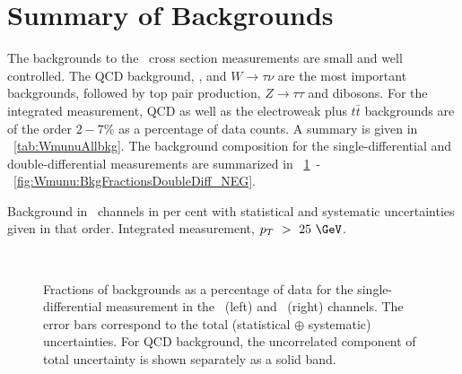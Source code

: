 \section{Summary of Backgrounds}

The backgrounds to the \Wmn\ cross section measurements are small and well controlled. The QCD background, \Zmm, and $W \to \tau\nu$ are the most important backgrounds, followed by top pair production, $Z \to \tau\tau$ and dibosons. For the integrated measurement, QCD as well as the electroweak plus $t\bar{t}$ backgrounds are of the order $2-7\%$ as a percentage of data counts. A summary is given in \Tab~\ref{tab:WmunuAllbkg}.
The background composition for the single-differential and double-differential measurements are summarized in \Fig~\ref{fig:Wmunu:bg_frac_vsEta_pt25}~-~\ref{fig:Wmunu:BkgFractionsDoubleDiff_NEG}.

\begin{table}
  \begin{center}
    
    \caption{ Background in \Wmn\ channels in per cent with statistical and systematic uncertainties given in that order. Integrated measurement, $p_T~>~25~\GeV$. }
    \label{tab:WmunuAllbkg}
  \end{center}
\end{table}

\begin{figure}[phtb]
  \begin{center}
        \\
    \caption{ Fractions of backgrounds as a percentage of data for the single-differential measurement in the \Wmunup\ (left) and \Wmunum\ (right) channels. The error bars correspond to the total (statistical  $\oplus$ systematic) uncertainties. For QCD background, the uncorrelated component of total uncertainty is shown separately as a solid band.}
 \label{fig:Wmunu:bg_frac_vsEta_pt25}
 \end{center}
\end{figure}

